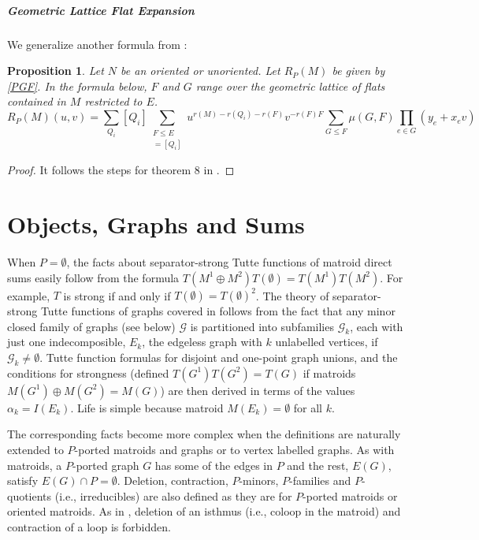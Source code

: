 \documentclass[12pt,leqno]{amsart}
\newtheorem{prop}[lem]{Proposition}
\theoremstyle{remark}
\begin{document}
\subsubsection{Geometric Lattice Flat Expansion}

We generalize another formula from \cite{sdcPorted}:

\begin{prop}
Let $N$ be an oriented or unoriented.
Let $R_P(M)$ be given by \eqref{PGF}.
In the formula below,
$F$ and $G$ range over the geometric lattice of flats contained
in $M$ restricted to $E$.
\begin{equation}
R_P(M)(u,v) = \sum_{Q_i} [Q_i]
      \sum_{\substack{F\leq E\\
                     [M/F|P]=[Q_i]
           }}
                   u^{r(M)-r(Q_i)-r(F)}
                   v^{-r(F)F}
                   \sum_{G\le F}
                   \mu(G,F)
                   \prod_{e\in G}
                    (y_e+x_ev)
\end{equation}
\end{prop}

\begin{proof}
It follows the steps for theorem 8 in \cite{sdcPorted}.
\end{proof}

\part{Objects, Graphs and Sums}


When $P=\emptyset$, the facts about separator-strong Tutte functions
of matroid direct sums easily follow from the formula
$T(M^1\oplus M^2)T(\emptyset)=T(M^1)T(M^2)$.  For example,
$T$ is strong if and only if $T(\emptyset)=T(\emptyset)^2$.
The theory of separator-strong Tutte functions of graphs covered
in \cite{Ellis-Monaghan-Traldi}  follows from the fact that any
minor closed family of graphs (see below) $\mathcal{G}$ is partitioned into
subfamilies $\mathcal{G}_k$, each with just one indecomposible,
$E_k$, the edgeless graph with $k$ unlabelled vertices, 
if $\mathcal{G}_k\neq\emptyset$.
Tutte function formulas for disjoint and one-point graph unions, 
and the conditions for strongness (defined $T(G^1)T(G^2)=T(G)$ if
matroids $M(G^1)\oplus M(G^2)=M(G)$) are then 
derived \cite{Ellis-Monaghan-Traldi}
in terms of the values $\alpha_k=I(E_k)$.  Life is simple because
matroid $M(E_k)=\emptyset$ for all $k$.

The corresponding facts become more complex when the definitions
are naturally extended to $P$-ported matroids and graphs
or to vertex labelled graphs.  As with
matroids, a $P$-ported graph $G$ has some of the edges in $P$ and the rest,
$E(G)$, satisfy $E(G)\cap P=\emptyset$.  Deletion, contraction,
$P$-minors, $P$-families and $P$-quotients (i.e., irreducibles)
are also defined as they are for $P$-ported matroids or oriented matroids.
As in \cite{Ellis-Monaghan-Traldi},
deletion of an isthmus (i.e., coloop in the matroid) and
contraction of a loop is forbidden.
\end{document}
